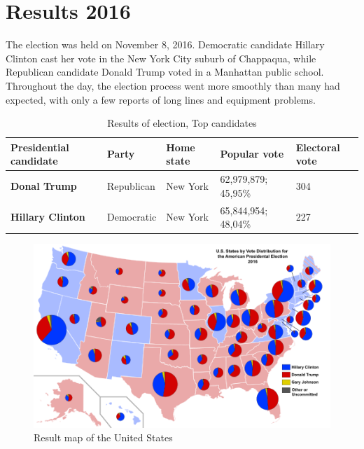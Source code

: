 \newpage
	
\section{Results 2016}
The election was held on November 8, 2016. Democratic candidate Hillary Clinton cast her vote in the New York City suburb of Chappaqua, while Republican candidate Donald Trump voted in a Manhattan public school. Throughout the day, the election process went more smoothly than many had expected, with only a few reports of long lines and equipment problems.

\begin{table}[!h]
	\centering
	\caption{Results of election, Top candidates}
	\label{result}
	\begin{tabular}{|l|l|l|l|l|}
		\hline
		\textbf{Presidential candidate} & \textbf{Party} & \textbf{Home state} & \textbf{Popular vote} & \textbf{Electoral vote} \\ \hline
		\textbf{Donal Trump}            & Republican     & New York            & 62,979,879; 45,95\%   & 304                     \\ \hline
		\textbf{Hillary Clinton}        & Democratic     & New York            & 65,844,954; 48,04\%   & 227                     \\ \hline
	\end{tabular}
\end{table}

\begin{figure}[!h]
	\begin{center}
		\includegraphics[width=0.8\linewidth]{images/map}
		\caption{Result map of the United States}
	\end{center}
\end{figure}


